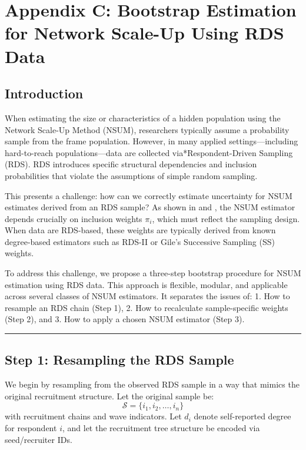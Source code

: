 \documentclass[
  12pt,
  letterpaper,
  DIV=11,
  numbers=noendperiod]{scrartcl}
\theoremstyle{plain}
\theoremstyle{definition}
\begin{document}
\section{Appendix C: Bootstrap Estimation for Network Scale-Up Using RDS
Data}\label{app-3step}

\subsection{Introduction}\label{introduction}

When estimating the size or characteristics of a hidden population using
the Network Scale-Up Method (NSUM), researchers typically assume a
probability sample from the frame population. However, in many applied
settings---including hard-to-reach populations---data are collected
via*Respondent-Driven Sampling (RDS). RDS introduces specific structural
dependencies and inclusion probabilities that violate the assumptions of
simple random sampling.

This presents a challenge: how can we correctly estimate uncertainty for
NSUM estimates derived from an RDS sample? As shown in
\textcite{feeh16-generalized} and \textcite{salg06-variance}, the NSUM
estimator depends crucially on inclusion weights \(\pi_i\), which must
reflect the sampling design. When data are RDS-based, these weights are
typically derived from known degree-based estimators such as RDS-II or
Gile's Successive Sampling (SS) weights.

To address this challenge, we propose a three-step bootstrap procedure
for NSUM estimation using RDS data. This approach is flexible, modular,
and applicable across several classes of NSUM estimators. It separates
the issues of: 1. How to resample an RDS chain (Step 1), 2. How to
recalculate sample-specific weights (Step 2), and 3. How to apply a
chosen NSUM estimator (Step 3).

\begin{center}\rule{0.5\linewidth}{0.5pt}\end{center}

\subsection{Step 1: Resampling the RDS
Sample}\label{step-1-resampling-the-rds-sample}

We begin by resampling from the observed RDS sample in a way that mimics
the original recruitment structure. Let the original sample be: \[
\mathcal{S} = \{i_1, i_2, \dots, i_n\}
\] with recruitment chains and wave indicators. Let \(d_i\) denote
self-reported degree for respondent \(i\), and let the recruitment tree
structure be encoded via seed/recruiter IDs.
\end{document}
